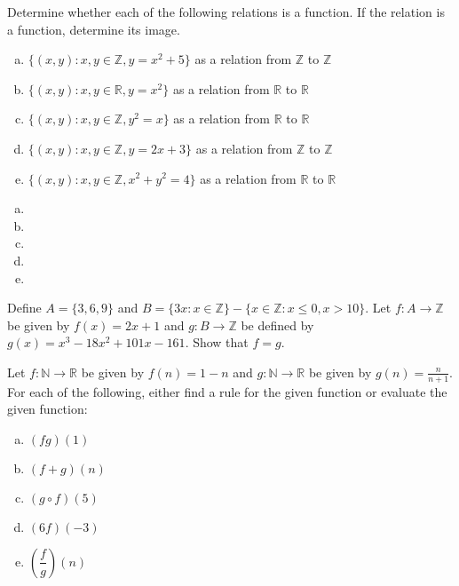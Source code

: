\documentclass[11pt,letterpaper]{article}
\begin{document}

 Determine whether each of the following relations is a function. If the relation is a function, determine its image.
	\begin{enumerate}[(a)]
	\item $\{ (x, y) \colon x, y \in \mathbb{Z}, y= x^2 + 5 \}$ as a relation from $\mathbb{Z}$ to $\mathbb{Z}$
	\item $\{ (x, y) \colon x, y \in \mathbb{R}, y= x^2 \}$ as a relation from $\mathbb{R}$ to $\mathbb{R}$
	\item $\{ (x, y) \colon x, y \in \mathbb{Z}, y^2= x \}$ as a relation from $\mathbb{R}$ to $\mathbb{R}$
	\item $\{ (x, y) \colon x, y \in \mathbb{Z}, y= 2x + 3 \}$ as a relation from $\mathbb{Z}$ to $\mathbb{Z}$
	\item $\{ (x, y) \colon x, y \in \mathbb{Z}, x^2 + y^2= 4 \}$ as a relation from $\mathbb{R}$ to $\mathbb{R}$
	\end{enumerate} \pspace

\sol
\begin{enumerate}[(a)]
\item 
\item 
\item 
\item 
\item 
\end{enumerate}



\newpage



 Define $A= \{ 3, 6, 9 \}$ and $B= \{ 3x \colon x \in \mathbb{Z} \} - \{ x \in \mathbb{Z} \colon x \leq 0, x > 10 \}$. Let $f: A \to \mathbb{Z}$ be given by $f(x)= 2x + 1$ and $g: B \to \mathbb{Z}$ be defined by $g(x)= x^3 - 18x^2 + 101x - 161$. Show that $f= g$. \pspace

\sol 



\newpage



 Let $f: \mathbb{N} \to \mathbb{R}$ be given by $f(n)= 1 - n$ and $g: \mathbb{N} \to \mathbb{R}$ be given by $g(n)= \frac{n}{n + 1}$. For each of the following, either find a rule for the given function or evaluate the given function:
	\begin{enumerate}[(a)]
	\item $(fg)(1)$
	\item $(f + g)(n)$
	\item $(g \circ f)(5)$
	\item $(6f)(-3)$
	\item $\left( \dfrac{f}{g} \right)(n)$
	\end{enumerate} \pspace
\end{document}
